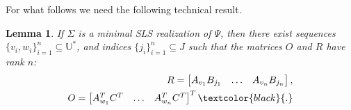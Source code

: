 \documentclass[journal,twoside,web]{ieeecolor}
\newtheorem{Lemma}[Theorem]{Lemma}
\newcommand{\SPAN}{\mathrm{Span}}
\begin{document}
For what follows we need the following technical result.
\begin{Lemma}
  \label{theo:real2}
  If $\Sigma$ is a minimal SLS realization of $\Psi$, then
  there exist sequences $\{v_i,w_i\}_{i=1}^{n} \subseteq \mathbb{U}^{*}$,
  and indices $\{j_i\}_{i=1}^{n} \subseteq  J$
  such that the matrices $O$ and $R$ have rank $n$:
  \begin{align*}
       R=\begin{bmatrix} A_{v_1}B_{j_1} & \ldots & A_{v_n}B_{j_n} \end{bmatrix} ,\\
      O=\begin{bmatrix} A_{w_1}^TC^T & \ldots & A_{w_n}^TC^T \end{bmatrix}^T\textcolor{black}{.}
  \end{align*}
\end{Lemma}
\end{document}
